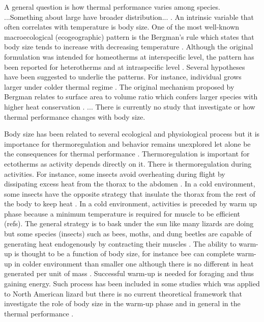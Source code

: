 A general question is how thermal performance varies among species.
...Something about large have broader distribution... \citep{Lumaret1996}.
An intrinsic variable that often correlates with temperature is body size.
One of the most well-known macroecological (ecogeographic) pattern is the Bergman's rule which states that body size tends to increase with decreasing temperature \citep{Bergman1847}. 
Although the original formulation was intended for homeotherms at interspecific level, the pattern has been reported for heterotherms and at intraspecific level \citep{Blackburn1999}.
Several hypotheses have been suggested to underlie the patterns.
For instance, individual grows larger under colder thermal regime \citep{Van1996}.
The original mechanism proposed by Bergman relates to surface area to volume ratio which confers larger species with higher heat conservation \citep{Blackburn1999}.
...
There is currently no study that investigate or how thermal performance changes with body size.

Body size has been related to several ecological and physiological process but it is importance for thermoregulation and behavior remains unexplored let alone be the consequences for thermal performance \citep{Dial2008}.
Thermoregulation  is important for ectotherms as activity depends directly on it.
There is thermoregulation during activities.
For instance, some insects avoid overheating during flight by dissipating excess heat from the thorax to the abdomen \citep{Verdu2012}.
In a cold environment, some insects have the opposite strategy that insulate the thorax from the rest of the body to keep heat \citep{Verdu2012}.
In a cold environment, activities is  preceded by warm up phase because a minimum temperature is required for muscle to be efficient (refs).
The general strategy is to bask under the sun like many lizards are doing but some species (insects) such as bees, moths, and dung beetles are capable of generating heat endogenously by contracting their muscles \citep{Heinrich1975, Bartholomew1978, Bartholomew1981}.
The ability to warm-up is thought to be a function of body size, for instance  bee can complete warm-up in colder environment than smaller one although there is no different in heat generated per unit of mass \citep{Kammer1974, Heinrich1975}.
Successful warm-up is needed for foraging and thus gaining energy.
Such process has been included in some studies \citet[e.g.,][]{Buckley2008} which was applied to North American lizard but there is no current theoretical framework that investigate the role of body size in the warm-up phase and in general in the thermal performance \citep{Dial2008}.

